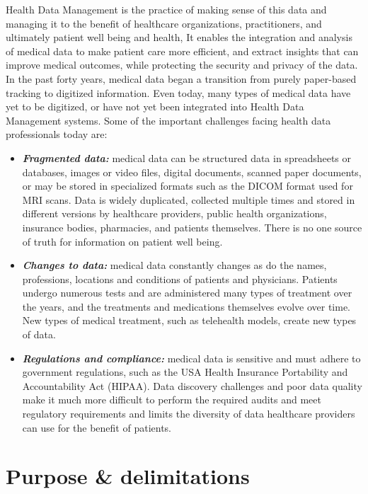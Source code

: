 Health Data Management is the practice of making sense of this data and managing it to the benefit of healthcare organizations, practitioners, and ultimately patient well being and health, It enables the integration and analysis of medical data to make patient care more efficient, and extract insights that can improve medical outcomes, while protecting the security and privacy of the data. In the past forty years, medical data began a transition from purely paper-based tracking to digitized information. Even today, many types of medical data have yet to be digitized, or have not yet been integrated into Health Data Management systems. Some of the important challenges facing health data professionals today are\cite{HealthDataManagement}:
\begin{itemize}
    \item \textbf{\textit{Fragmented data:}} medical data can be structured data in spreadsheets or databases, images or video files, digital documents, scanned paper documents, or may be stored in specialized formats such as the DICOM format used for MRI scans. Data is widely duplicated, collected multiple times and stored in different versions by healthcare providers, public health organizations, insurance bodies, pharmacies, and patients themselves. There is no one source of truth for information on patient well being.
    \item \textbf{\textit{Changes to data:}} medical data constantly changes as do the names, professions, locations and conditions of patients and physicians. Patients undergo numerous tests and are administered many types of treatment over the years, and the treatments and medications themselves evolve over time. New types of medical treatment, such as telehealth models, create new types of data.
    \item \textbf{\textit{Regulations and compliance:}} medical data is sensitive and must adhere to government regulations, such as the USA Health Insurance Portability and Accountability Act (HIPAA). Data discovery challenges and poor data quality make it much more difficult to perform the required audits and meet regulatory requirements and limits the diversity of data healthcare providers can use for the benefit of patients.
  \end{itemize}




\section{Purpose \& delimitations}


